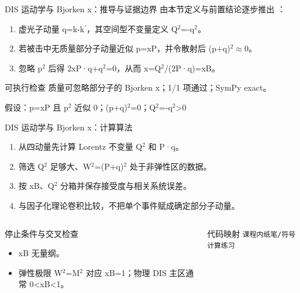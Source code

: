 \begin{frame}[t]{DIS 运动学与 Bjorken x：推导与证据边界}
\footnotesize
{}\quad 由本节定义与前置结论逐步推出 ：
\begin{enumerate}
\item 虚光子动量 q=k-k\ensuremath{^{\prime}}，其空间型不变量定义 Q\ensuremath{^{2}}=-q\ensuremath{^{2}}。
\item 若被击中无质量部分子动量近似 p=xP，并令散射后 (p+q)\ensuremath{^{2}}\ensuremath{\approx}0。
\item 忽略 p\ensuremath{^{2}} 后得 2xP·q+q\ensuremath{^{2}}=0，从而 x=Q\ensuremath{^{2}}/\allowbreak{}(2P·q)=xB。
\end{enumerate}\begin{block}{可执行检查}
\quad 质量可忽略部分子的 Bjorken x；1/1 项通过；SymPy exact。
\par\scriptsize 假设：p=xP 且 p\ensuremath{^{2}} 近似 0；(p+q)\ensuremath{^{2}}=0；Q\ensuremath{^{2}}=-q\ensuremath{^{2}}>0
\end{block}
\end{frame}

\begin{frame}[t]{DIS 运动学与 Bjorken x：计算算法}
\footnotesize
{}\begin{enumerate}
\item 从四动量先计算 Lorentz 不变量 Q\ensuremath{^{2}} 和 P·q。
\item 筛选 Q\ensuremath{^{2}} 足够大、W\ensuremath{^{2}}=(P+q)\ensuremath{^{2}} 处于非弹性区的数据。
\item 按 xB、Q\ensuremath{^{2}} 分箱并保存接受度与相关系统误差。
\item 与因子化理论卷积比较，不把单个事件赋成确定部分子动量。
\end{enumerate}\begin{columns}[T,onlytextwidth]
\begin{block}{停止条件与交叉检查}\scriptsize\begin{itemize}
\item[\CheckMark] xB 无量纲。
\item[\CheckMark] 弹性极限 W\ensuremath{^{2}}=M\ensuremath{^{2}} 对应 xB=1；物理 DIS 主区通常 0<xB<1。
\end{itemize}\end{block}
\begin{block}{代码映射}
\scriptsize \texttt{课程内纸笔/\allowbreak{}符号计算练习}
\end{block}\end{columns}\end{frame}

